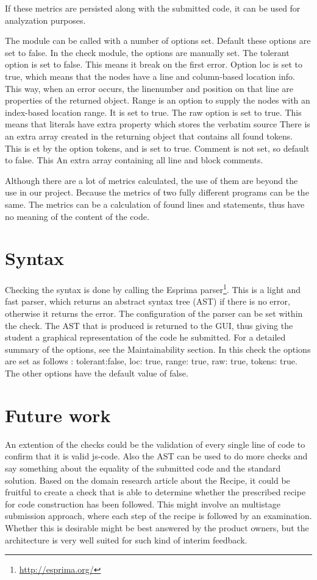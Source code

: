 If these metrics are persisted along with the submitted code, it can be used for
analyzation purposes.

The module can be called with a number of options set.
Default these options are set to false.
In the \gls{check} module, the options are manually set.
The tolerant option is set to false. This means it break on the first error.
Option loc is set to true, which means that the nodes have a line and column-based location info.
This way, when an error occurs, the linenumber and position on that line are properties of the returned object.
Range is an option to supply the nodes with an index-based location range. It is set to true.
The raw option is set to true. This means that literals have extra property which stores the verbatim source
There is an extra array created in the returning object that contains all found tokens. This is et by the option tokens, and is set to true.
Comment is not set, so default to false. This An extra array containing all line and block comments.

Although there are a lot of metrics calculated, the use of them are beyond the
use in our project.
Because the metrics of two fully different programs can be the same.
The metrics can be a calculation of found lines and statements, 
thus have no meaning of the content of the code.


\section{Syntax}

Checking the syntax is done by calling the Esprima 
parser\footnote{\url{http://esprima.org/}}. This is a light and fast parser, 
which returns an abstract syntax tree (AST) if there is no error, otherwise it returns
the error. The configuration of the parser can be set within the check.
The AST that is produced is returned to the GUI, thus giving the \gls{student} a
graphical representation of the code he submitted.
For a detailed summary of the options, see the Maintainability section.
In this \gls{check} the options are set as follows : tolerant:false, loc: true, range: true, raw: true, tokens: true.
The other options have the default value of false.


\section{Future work}
An extention of the \glspl{check} could be the validation of
every single line of code to confirm that it is valid \gls{js-code}.
Also the AST can be used to do more \glspl{check} and say something about the
equality of the submitted code and the standard solution. Based on the domain 
research article about the Recipe, it could be fruitful to create a \gls{check} 
that is able to determine whether the prescribed recipe for code construction 
has been followed. This might involve an multistage submission approach, where 
each step of the recipe is followed by an examination. Whether this is desirable
might be best answered by the product owners, but the architecture is very well
suited for such kind of interim feedback.

